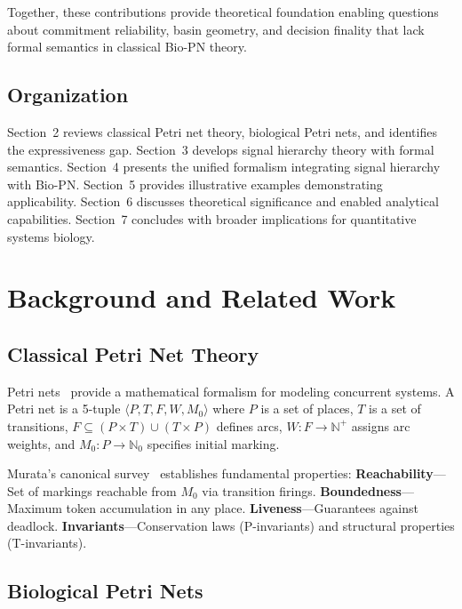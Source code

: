 \documentclass[twocolumn,11pt]{article}
\begin{document}
\noindent Together, these contributions provide theoretical foundation enabling questions about commitment reliability, basin geometry, and decision finality that lack formal semantics in classical Bio-PN theory.

\subsection{Organization}

Section~2 reviews classical Petri net theory, biological Petri nets, and identifies the expressiveness gap. Section~3 develops signal hierarchy theory with formal semantics. Section~4 presents the unified formalism integrating signal hierarchy with Bio-PN. Section~5 provides illustrative examples demonstrating applicability. Section~6 discusses theoretical significance and enabled analytical capabilities. Section~7 concludes with broader implications for quantitative systems biology.

\section{Background and Related Work}

\subsection{Classical Petri Net Theory}

Petri nets~\cite{petri1962} provide a mathematical formalism for modeling concurrent systems. A Petri net is a 5-tuple $\langle P, T, F, W, M_0 \rangle$ where $P$ is a set of places, $T$ is a set of transitions, $F \subseteq (P \times T) \cup (T \times P)$ defines arcs, $W: F \to \mathbb{N}^+$ assigns arc weights, and $M_0: P \to \mathbb{N}_0$ specifies initial marking.

Murata's canonical survey~\cite{murata1989} establishes fundamental properties: \textbf{Reachability}---Set of markings reachable from $M_0$ via transition firings. \textbf{Boundedness}---Maximum token accumulation in any place. \textbf{Liveness}---Guarantees against deadlock. \textbf{Invariants}---Conservation laws (P-invariants) and structural properties (T-invariants).

\subsection{Biological Petri Nets}
\end{document}
